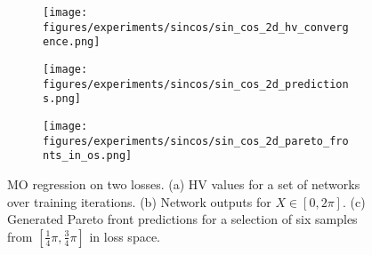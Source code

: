 \begin{figure*}[ht!]
\begin{subfigure}{0.32\textwidth}
    \centering
    \texttt{[image: figures/experiments/sincos/sin\_cos\_2d\_hv\_convergence.png]}
    \caption{}
    \label{fig:sincos_2d_losses}
\end{subfigure}
\begin{subfigure}{0.32\textwidth}
    \centering
    \texttt{[image: figures/experiments/sincos/sin\_cos\_2d\_predictions.png]}
    \caption{}
    \label{fig:sincos_2d_predictions}
\end{subfigure}
\begin{subfigure}{0.32\textwidth}
    \centering
    \texttt{[image: figures/experiments/sincos/sin\_cos\_2d\_pareto\_fronts\_in\_os.png]}
    \caption{}
    \label{fig:sincos_2d_os}
\end{subfigure}
    \centering
    \caption{MO regression on two losses. (a) HV values for a set of networks over training iterations. (b) Network outputs for $X\in[0,2\pi]$. (c) Generated Pareto front predictions for a selection of six samples from $[\tfrac{1}{4}\pi,\tfrac{3}{4}\pi]$ in loss space.}
    \label{fig:sincos_2d}
\end{figure*}

